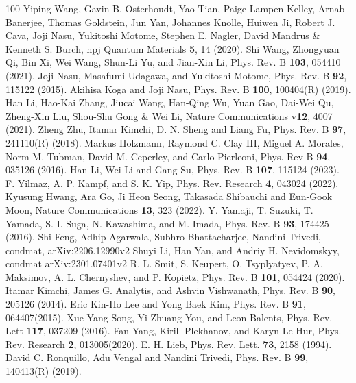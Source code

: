 \documentclass[aps,amsmath,twocolumn,amssymb,floatfix,showpacs,superscriptaddress,nofootinbib,longbibliography]{revtex4-1}
\begin{document}
\begin{thebibliography}{100}
 Yiping Wang, Gavin B. Osterhoudt, Yao Tian, Paige Lampen-Kelley, Arnab Banerjee, Thomas Goldstein, Jun Yan,
Johannes Knolle, Huiwen Ji, Robert J. Cava, Joji Nasu, Yukitoshi Motome, Stephen E. Nagler, David Mandrus \& Kenneth S. Burch, npj Quantum Materials {\bf 5}, 14 (2020).
 Shi Wang, Zhongyuan Qi, Bin Xi, Wei Wang, Shun-Li Yu, and Jian-Xin Li, Phys. Rev. B {\bf 103}, 054410 (2021).
 Joji Nasu, Masafumi Udagawa, and Yukitoshi Motome, Phys. Rev. B {\bf 92}, 115122 (2015).
 Akihisa Koga and Joji Nasu, Phys. Rev. B {\bf 100}, 100404(R) (2019).
Han Li, Hao-Kai Zhang, Jiucai Wang, Han-Qing Wu, Yuan Gao, Dai-Wei Qu,
Zheng-Xin Liu, Shou-Shu Gong $\&$ Wei Li, Nature Communications v{\bf 12},  4007 (2021).
 Zheng Zhu, Itamar Kimchi, D. N. Sheng and Liang Fu, Phys. Rev. B {\bf 97}, 241110(R) (2018).
Markus Holzmann, Raymond C. Clay III, Miguel A. Morales, Norm M. Tubman, David M. Ceperley, and Carlo Pierleoni, Phys. Rev B {\bf 94}, 035126 (2016).
 Han Li, Wei Li and Gang Su, Phys. Rev. B {\bf 107}, 115124 (2023).
F. Yilmaz, A. P. Kampf, and S. K. Yip,  Phys. Rev. Research {\bf 4}, 043024 (2022).
 Kyusung Hwang, Ara Go, Ji Heon Seong, Takasada Shibauchi and Eun-Gook Moon, Nature Communications {\bf 13}, 323 (2022). 
 Y. Yamaji, T. Suzuki, T. Yamada, S. I. Suga, N. Kawashima, and M. Imada, Phys. Rev. B {\bf 93}, 174425 (2016).
Shi Feng, Adhip Agarwala, Subhro Bhattacharjee, Nandini Trivedi, condmat, arXiv:2206.12990v2
Shuyi Li, Han Yan, and Andriy H. Nevidomskyy, condmat arXiv:2301.07401v2
R. L. Smit, S. Keupert, O. Tsyplyatyev, P. A. Maksimov, A. L. Chernyshev, and P. Kopietz, Phys. Rev. B {\bf 101}, 054424 (2020).
Itamar Kimchi, James G. Analytis, and Ashvin Vishwanath, Phys. Rev. B {\bf 90}, 205126 (2014).
 Eric Kin-Ho Lee and Yong Baek Kim, Phys. Rev. B {\bf 91}, 064407(2015).
 Xue-Yang Song, Yi-Zhuang You, and Leon Balents, Phys. Rev. Lett {\bf 117}, 037209 (2016).
Fan Yang, Kirill Plekhanov, and Karyn Le Hur, Phys. Rev. Research {\bf 2}, 013005(2020). 
E. H. Lieb, Phys. Rev. Lett. {\bf 73}, 2158 (1994).
David C. Ronquillo, Adu Vengal and Nandini Trivedi, Phys. Rev. B {\bf 99}, 140413(R) (2019).

\end{thebibliography}
\end{document}
